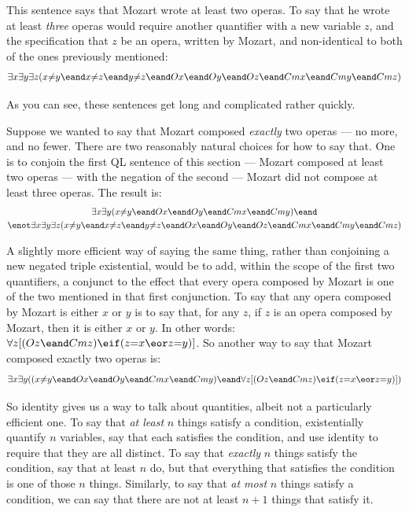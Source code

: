This sentence says that Mozart wrote at least two operas. To say that he wrote at least \emph{three} operas would require another quantifier with a new variable $z$, and the specification that $z$ be an opera, written by Mozart, and non-identical to both of the ones previously mentioned:
\begin{multline*}
\exists x \exists y \exists z (x {\neq} y \eand x {\neq} z \eand y {\neq} z \eand 
Ox \eand Oy \eand Oz \eand Cmx \eand Cmy \eand Cmz)
\end{multline*}

As you can see, these sentences get long and complicated rather quickly.

Suppose we wanted to say that Mozart composed \emph{exactly} two operas --- no more, and no fewer. There are two reasonably natural choices for how to say that. One is to conjoin the first QL sentence of this section --- Mozart composed at least two operas --- with the negation of the second --- Mozart did not compose at least three operas. The result is:
\begin{multline*}
\exists x \exists y (x {\neq} y \eand Ox \eand Oy \eand Cmx \eand Cmy) \eand \\ \enot \exists x \exists y \exists z (x {\neq} y \eand x {\neq} z \eand y {\neq} z \eand Ox \eand Oy \eand Oz \eand Cmx \eand Cmy \eand Cmz)
\end{multline*}

A slightly more efficient way of saying the same thing, rather than conjoining a new negated triple existential, would be to add, within the scope of the first two quantifiers, a conjunct to the effect that every opera composed by Mozart is one of the two mentioned in that first conjunction. To say that any opera composed by Mozart is either $x$ or $y$ is to say that, for any $z$, if $z$ is an opera composed by Mozart, then it is either $x$ or $y$. In other words: $\forall z [(Oz \eand Cmz) \eif (z{=}x \eor z{=}y)]$. So another way to say that Mozart composed exactly two operas is:
\begin{multline*}
\exists x \exists y ((x {\neq} y  \eand  Ox \eand Oy \eand  Cmx \eand Cmy) \eand \forall z [(Oz \eand Cmz) \eif (z{=}x \eor z{=}y)])
\end{multline*}

So identity gives us a way to talk about quantities, albeit not a particularly efficient one. To say that \emph{at least} $n$ things satisfy a condition, existentially quantify $n$ variables, say that each satisfies the condition, and use identity to require that they are all distinct. To say that \emph{exactly} $n$ things satisfy the condition, say that at least $n$ do, but that everything that satisfies the condition is one of those $n$ things. Similarly, to say that \emph{at most} $n$ things satisfy a condition, we can say that there are not at least $n+1$ things that satisfy it.



